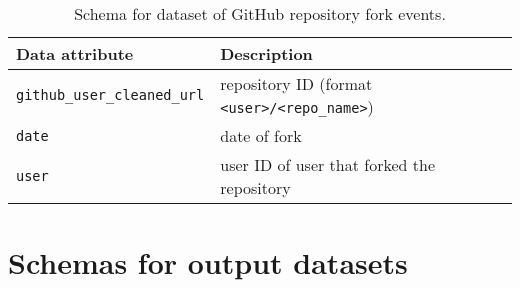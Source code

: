 \documentclass[10pt,a4paper]{scrartcl}
\begin{document}
\begin{table}
    \centering
    \begin{tabular}{l|l}
        \hline
        Data attribute & Description \\
        \hline
        \verb|github_user_cleaned_url| & repository ID (format \verb|<user>/<repo_name>|) \\
        \verb|date| & date of fork \\
        \verb|user| & user ID of user that forked the repository \\
        \hline
    \end{tabular}
    \caption{Schema for dataset of GitHub repository fork events.}
    \label{table:forks}
\end{table}

\section{Schemas for output datasets}
\label{section:app_schemas_output}

\end{document}
